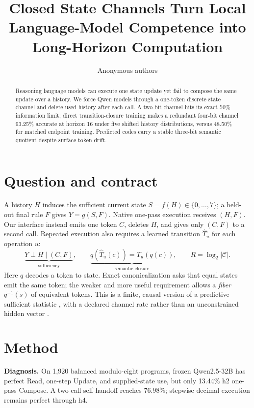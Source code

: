 \documentclass[9pt,twocolumn]{extarticle}
\title{\vspace{-1.35em}\textbf{Closed State Channels Turn Local Language-Model
Competence into Long-Horizon Computation}\vspace{-0.65em}}
\author{\normalsize Anonymous authors}
\date{}
\newcommand{\state}{S}
\newcommand{\code}{C}
\begin{document}
\maketitle
\vspace{-1.45em}
\begin{abstract}
\small
Reasoning language models can execute one state update yet fail to compose the
same update over a history.  We force Qwen models through a one-token discrete
state channel and delete used history after each call.  A two-bit channel hits
its exact 50\% information limit; direct transition-closure training makes a
redundant four-bit channel 93.25\% accurate at horizon 16 under five shifted
history distributions, versus 48.50\% for matched endpoint training.  Predicted
codes carry a stable three-bit semantic quotient despite surface-token drift.
\end{abstract}
\vspace{-0.55em}
\balance

\section*{\fontsize{9}{10}\selectfont Question and contract}
\vspace{-0.3em}
A history $H$ induces the sufficient current state
$\state=f(H)\in\{0,\ldots,7\}$; a held-out final rule $F$ gives
$Y=g(\state,F)$.  Native one-pass execution receives $(H,F)$.
Our interface instead emits one token $\code$, deletes $H$, and gives only
$(\code,F)$ to a second call.  Repeated execution also requires a learned
transition $\widehat T_u$ for each operation $u$:
\[
\underbrace{Y\perp H\mid(\code,F)}_{\text{sufficiency}},\qquad
\underbrace{q(\widehat T_u(c))=T_u(q(c))}_{\text{semantic closure}},\qquad
R=\log_2|\mathcal C|.
\]
Here $q$ decodes a token to state.  Exact canonicalization asks that equal
states emit the same token; the weaker and more useful requirement allows a
\emph{fiber} $q^{-1}(s)$ of equivalent tokens.  This is a finite, causal version
of a predictive sufficient statistic \cite{shalizi2001}, with a declared
channel rate rather than an unconstrained hidden vector
\cite{shannon1948,tishby2000}.

\section*{\fontsize{9}{10}\selectfont Method}
\vspace{-0.3em}
\textbf{Diagnosis.}  On 1,920 balanced modulo-eight programs, frozen
Qwen2.5-32B has perfect Read, one-step Update, and supplied-state use, but only
13.44\% h2 one-pass Compose.  A two-call self-handoff reaches 76.98\%; stepwise
decimal execution remains perfect through h4.
\end{document}
